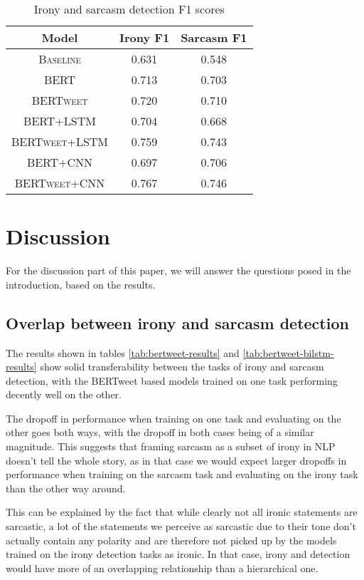 \documentclass[10pt, a4paper]{article}
\begin{document}
\begin{table}[h!]
   \caption{Irony and sarcasm detection F1 scores}
   \label{tab:correlation}
   \begin{center}
   \begin{tabular}{|c|c|c|}
   \toprule
   Model & Irony F1 & Sarcasm F1 \\
   \midrule
   \textsc{Baseline} & 0.631 & 0.548 \\
   \textsc{BERT} & 0.713 & 0.703 \\
   \textsc{BERTweet} & 0.720 & 0.710 \\
   \textsc{BERT+LSTM} & 0.704 & 0.668 \\
   \textsc{BERTweet+LSTM} & 0.759 & 0.743 \\
   \textsc{BERT+CNN} & 0.697 & 0.706 \\
   \textsc{BERTweet+CNN} & 0.767 & 0.746 \\
   \bottomrule
   \end{tabular}
   \end{center}
\end{table}

\section{Discussion}\label{discussion}
For the discussion part of this paper, we will answer the questions posed in the introduction, based on the results.

\subsection{Overlap between irony and sarcasm detection}
The results shown in tables \ref{tab:bertweet-results} and \ref{tab:bertweet-bilstm-results} show solid transferability between 
the tasks of irony and sarcasm detection, with the BERTweet based models trained on one task performing decently well on the other.

The dropoff in performance when training on one task and evaluating on the other goes both ways, with the dropoff in both cases 
being of a similar magnitude. This suggests that framing sarcasm as a subset of irony in NLP doesn't tell the whole story, as
in that case we would expect larger dropoffs in performance when training on the sarcasm task and evaluating on the irony task than
the other way around.

This can be explained by the fact that while clearly not all ironic statements are sarcastic, a lot of the statements we perceive 
as sarcastic due to their tone don't actually contain any polarity and are therefore not picked up by the models trained on the
irony detection tasks as ironic. In that case, irony and detection would have more of an overlapping relationship than a hierarchical
one.
\end{document}

